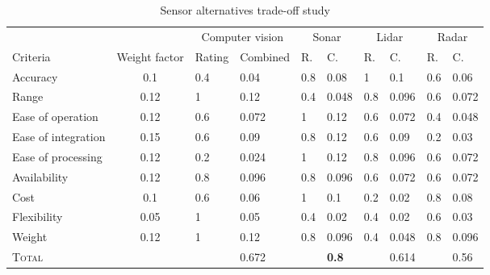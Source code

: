 
\begin{table}[htbp]
	\hspace{-0.5cm}
	\begin{tabular}{lc|ll|ll|ll|ll}
		
		\hline
					&					&	\multicolumn{2}{c|}{Computer vision}&	\multicolumn{2}{c|}{Sonar}	&	\multicolumn{2}{c|}{Lidar}	&	\multicolumn{2}{c}{Radar}	\\
		Criteria	&	Weight factor	&	Rating	&	Combined				&	R.	&	C.					&	R.	&	C.					&	R.	&	C.					\\
		\hline
		Accuracy			&	0.1	&	0.4	&	0.04	&	0.8	&	0.08&	1	&	0.1	&	0.6	&	0.06	\\
		Range				&	0.12&	1	&	0.12	&	0.4	&	0.048&	0.8	&	0.096&	0.6	&	0.072	\\
		Ease of operation	&	0.12&	0.6	&	0.072	&	1	&	0.12&	0.6	&	0.072&	0.4	&	0.048	\\
		Ease of integration	&	0.15&	0.6	&	0.09	&	0.8	&	0.12&	0.6	&	0.09&	0.2	&	0.03	\\
		Ease of processing	&	0.12&	0.2	&	0.024	&	1	&	0.12&	0.8	&	0.096&	0.6	&	0.072	\\
		Availability		&	0.12&	0.8	&	0.096	&	0.8	&	0.096&	0.6	&	0.072&	0.6	&	0.072	\\
		Cost				&	0.1	&	0.6	&	0.06	&	1	&	0.1	&	0.2	&	0.02&	0.8	&	0.08	\\
		Flexibility			&	0.05&	1	&	0.05	&	0.4	&	0.02&	0.4	&	0.02&	0.6	&	0.03	\\
		Weight				&	0.12&	1	&	0.12	&	0.8	&	0.096&	0.4	&	0.048&	0.8	&	0.096	\\
		\hline
		\scshape Total		&		&		&	0.672	&		&\bf 0.8&		&	0.614&		&	0.56	\\

	\end{tabular}
	\caption{Sensor alternatives trade-off study}
	\label{tab:tradeoff}
\end{table}
